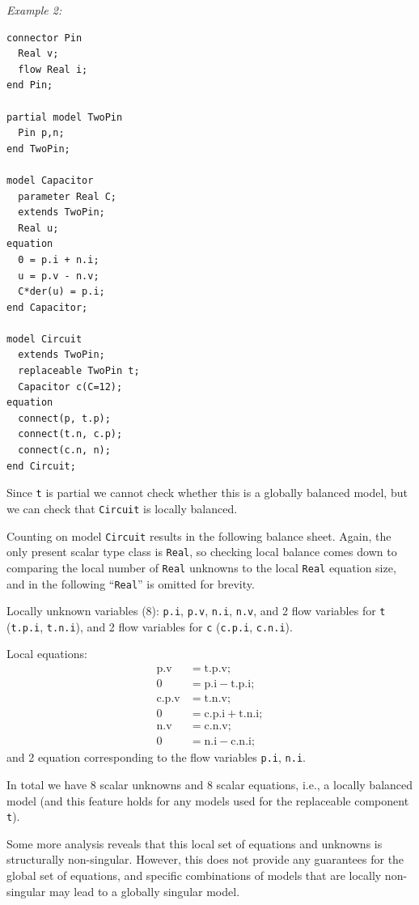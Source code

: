 \begin{example}
\emph{Example 2:}
\begin{lstlisting}[language=modelica]
connector Pin
  Real v;
  flow Real i;
end Pin;

partial model TwoPin
  Pin p,n;
end TwoPin;

model Capacitor
  parameter Real C;
  extends TwoPin;
  Real u;
equation
  0 = p.i + n.i;
  u = p.v - n.v;
  C*der(u) = p.i;
end Capacitor;

model Circuit
  extends TwoPin;
  replaceable TwoPin t;
  Capacitor c(C=12);
equation
  connect(p, t.p);
  connect(t.n, c.p);
  connect(c.n, n);
end Circuit;
\end{lstlisting}

Since \lstinline!t! is partial we cannot check whether this is a globally balanced model, but we can check that \lstinline!Circuit! is locally balanced.

Counting on model \lstinline!Circuit! results in the following balance sheet.
Again, the only present scalar type class is \lstinline!Real!, so checking local balance comes down to comparing the local number of \lstinline!Real! unknowns to the local \lstinline!Real! equation size, and in the following ``\lstinline!Real!'' is omitted for brevity.

Locally unknown variables (8): \lstinline!p.i!, \lstinline!p.v!, \lstinline!n.i!, \lstinline!n.v!, and 2 flow variables for \lstinline!t! (\lstinline!t.p.i!, \lstinline!t.n.i!), and 2 flow variables for \lstinline!c! (\lstinline!c.p.i!, \lstinline!c.n.i!).

Local equations:
\begin{align*} \text{p.v} &= \text{t.p.v};\\
0 &= \text{p.i}-\text{t.p.i};\\
\text{c.p.v} &= \text{t.n.v};\\
0 &= \text{c.p.i}+\text{t.n.i};\\
\text{n.v} &= \text{c.n.v};\\
0 &= \text{n.i}-\text{c.n.i};
\end{align*}
and 2 equation corresponding to the flow variables \lstinline!p.i!, \lstinline!n.i!.

In total we have 8 scalar unknowns and 8 scalar equations, i.e., a locally balanced model (and this feature holds for any models used for the replaceable component \lstinline!t!).

Some more analysis reveals that this local set of equations and unknowns is structurally non-singular.
However, this does not provide any guarantees for the global set of equations, and specific combinations of models that are locally non-singular may lead to a globally singular model.
\end{example}

